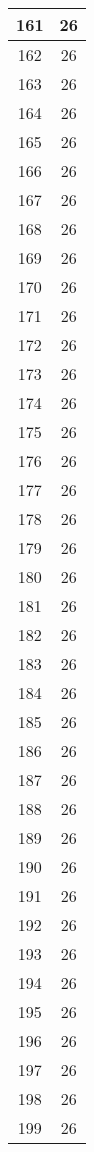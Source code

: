 \documentclass[letterpaper, 12pt]{article}
\begin{document}
\begin{longtable}{|c|c|}
161 & 26 \\
\hline
162 & 26 \\
\hline
163 & 26 \\
\hline
164 & 26 \\
\hline
165 & 26 \\
\hline
166 & 26 \\
\hline
167 & 26 \\
\hline
168 & 26 \\
\hline
169 & 26 \\
\hline
170 & 26 \\
\hline
171 & 26 \\
\hline
172 & 26 \\
\hline
173 & 26 \\
\hline
174 & 26 \\
\hline
175 & 26 \\
\hline
176 & 26 \\
\hline
177 & 26 \\
\hline
178 & 26 \\
\hline
179 & 26 \\
\hline
180 & 26 \\
\hline
181 & 26 \\
\hline
182 & 26 \\
\hline
183 & 26 \\
\hline
184 & 26 \\
\hline
185 & 26 \\
\hline
186 & 26 \\
\hline
187 & 26 \\
\hline
188 & 26 \\
\hline
189 & 26 \\
\hline
190 & 26 \\
\hline
191 & 26 \\
\hline
192 & 26 \\
\hline
193 & 26 \\
\hline
194 & 26 \\
\hline
195 & 26 \\
\hline
196 & 26 \\
\hline
197 & 26 \\
\hline
198 & 26 \\
\hline
199 & 26 \\
\hline
\end{longtable}
\end{document}
